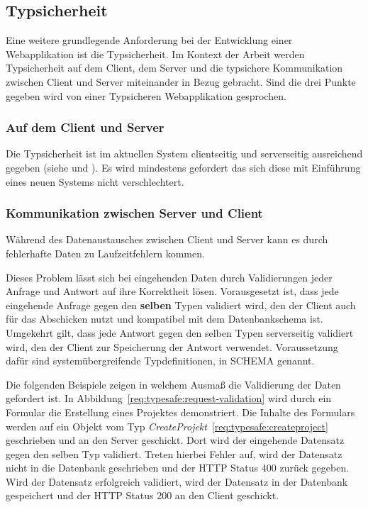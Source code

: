 \subsection{Typsicherheit}
\label{req:typesafe}
Eine weitere grundlegende Anforderung bei der Entwicklung einer Webapplikation ist die Typsicherheit.
Im Kontext der Arbeit werden Typsicherheit auf dem Client,
dem Server und die typsichere Kommunikation zwischen Client und Server miteinander in Bezug gebracht.
Sind die drei Punkte gegeben wird von einer Typsicheren Webapplikation gesprochen.

\subsubsection{Auf dem Client und Server}
\label{req:typesafe:client}
Die Typsicherheit ist im aktuellen System clientseitig und serverseitig ausreichend gegeben (siehe  und ).
Es wird mindestens gefordert das sich diese mit Einführung eines neuen Systems nicht verschlechtert.

\subsubsection{Kommunikation zwischen Server und Client}
\label{req:typesafe:api}
Während des Datenaustausches zwischen Client und Server kann es durch fehlerhafte Daten zu Laufzeitfehlern kommen.

Dieses Problem lässt sich bei eingehenden Daten durch Validierungen jeder Anfrage und Antwort auf ihre Korrektheit lösen.
Vorausgesetzt ist, dass jede eingehende Anfrage gegen den \textbf{selben} Typen validiert wird,
den der Client auch für das Abschicken nutzt und kompatibel mit dem Datenbankschema ist.
Umgekehrt gilt, dass jede Antwort gegen den selben Typen serverseitig validiert wird, den der Client zur Speicherung der Antwort verwendet.
Voraussetzung dafür sind systemübergreifende Typdefinitionen, in  SCHEMA genannt.

Die folgenden Beispiele zeigen in welchem Ausmaß die Validierung der Daten gefordert ist. In Abbildung~\ref{req:typesafe:request-validation} wird durch ein Formular die Erstellung eines Projektes demonstriert. Die Inhalte des Formulars werden auf ein Objekt vom Typ \emph{CreateProjekt}~\ref{req:typesafe:createproject} geschrieben und an den Server geschickt. Dort wird der eingehende Datensatz gegen den selben Typ validiert. Treten hierbei Fehler auf, wird der Datensatz nicht in die Datenbank geschrieben und der HTTP Status 400 zurück gegeben.
Wird der Datensatz erfolgreich validiert, wird der Datensatz in der Datenbank gespeichert und der HTTP Status 200 an den Client geschickt.

